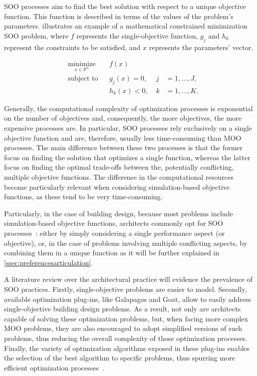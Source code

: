 	\ac{SOO} processes aim to find the best solution with respect to a unique objective function. This function is described in terms of the values of the problem's parameters.  illustrates an example of a mathematical constrained minimization \ac{SOO} problem, where $f$ represents the single-objective function, $g_j$ and $h_k$ represent the constraints to be satisfied, and $x$ represents the parameters' vector.
	
	\begin{equation} \label{eq:soo}
	\begin{aligned}
	& \underset{x \in \mathbb{R}^n}{\text{minimize}}
	& & f(x) \\
	& \text{subject to}
	& & g_j(x) = 0, & \; j &= 1, \ldots, J, \\ 
	&&& h_k(x) < 0, & \; k &= 1, \ldots, K.
	\end{aligned}
	\end{equation}
	
	Generally, the computational complexity of optimization processes is exponential on the number of objectives and, consequently, the more objectives, the more expensive processes are. In particular, \ac{SOO} processes rely exclusively on a single objective function and are, therefore, usually less time-consuming than \ac{MOO} processes. The main difference between these two processes is that the former focus on finding the solution that optimizes a single function, whereas the latter focus on finding the optimal trade-offs between the, potentially conflicting, multiple objective functions. The difference in the computational resources become particularly relevant when considering simulation-based objective functions, as these tend to be very time-consuming. 
	
	Particularly, in the case of building design, because most problems include simulation-based objective functions, architects commonly opt for \ac{SOO} processes~\cite{Wortmann2017Opossum}: either by simply considering a single performance aspect (or objective), or, in the case of problems involving multiple conflicting aspects, by combining them in a unique function as it will be further explained in \cref{ssec:preferencesarticulation}.
	
	A literature review over the architectural practice will evidence the prevalence of \ac{SOO} practices. Firstly, single-objective problems are easier to model. Secondly, available optimization plug-ins, like Galapagos and Goat, allow to easily address single-objective building design problems. As a result, not only are architects capable of solving these optimization problems, but, when facing more complex \ac{MOO} problems, they are also encouraged to adopt simplified versions of such problems, thus reducing the overall complexity of those optimization processes. Finally, the variety of optimization algorithms exposed in these plug-ins enables the selection of the best algorithm to specific problems, thus spurring more efficient optimization processes~\cite{Wortmann2016BBO}.  
	
